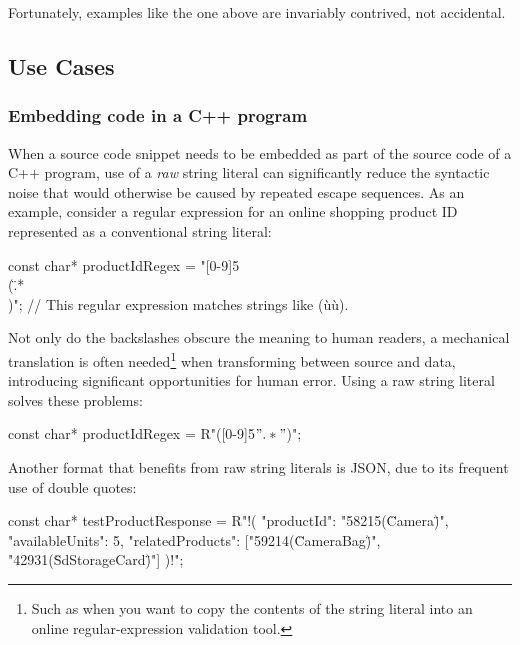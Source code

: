 \noindent Fortunately, examples like the one above are invariably contrived, not
accidental.

\subsection[Use Cases]{Use Cases}\label{use-cases}

\subsubsection[Embedding code in a C++ program]{Embedding code in a C++ program}\label{embedding-code-in-a-c++-program}

When a source code snippet needs to be embedded as part of the source
code of a C++ program, use of a \emph{raw} string literal can
significantly reduce the syntactic noise that would otherwise be caused
by repeated escape sequences. As an example, consider a regular
expression for an online shopping product ID represented as a
conventional string literal:

\begin{emcppslisting}
const char* productIdRegex = "[0-9]{5}\\(\".*\"\\)";
    // This regular expression matches strings like (ù{}ù).
\end{emcppslisting}
    
\noindent Not only do the backslashes obscure the meaning to human readers, a
mechanical translation is often needed{\cprotect\footnote{Such as when
you want to copy the contents of the string literal into an online
  regular-expression validation tool.}} when transforming between source
and data, introducing significant opportunities for human error. Using a
raw string literal solves these problems:

\begin{emcppslisting}
const char* productIdRegex = R"([0-9]{5}\(".*"\))";
\end{emcppslisting}
    
\noindent Another format that benefits from raw string literals is JSON, due to
its frequent use of double quotes:

\begin{emcppslisting}
const char* testProductResponse = R"!(
{
    "productId": "58215(\"Camera\")",
    "availableUnits": 5,
    "relatedProducts": ["59214(\"CameraBag\")", "42931(\"SdStorageCard\")"]
})!";
\end{emcppslisting}
    
